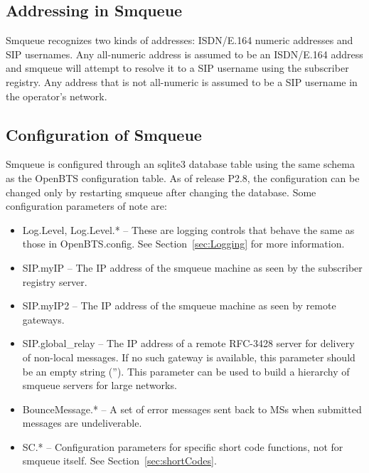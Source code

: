 \documentclass[11pt,openany]{book}
\begin{document}
\subsection{Addressing in Smqueue}
Smqueue recognizes two kinds of addresses: ISDN/E.164 numeric addresses and SIP usernames.  Any all-numeric address is assumed to be an ISDN/E.164 address and smqueue will attempt to resolve it to a SIP username using the subscriber registry.  Any address that is not all-numeric is assumed to be a SIP username in the operator's network.


\subsection{Configuration of Smqueue}
Smqueue is configured through an sqlite3 database table using the same schema as the OpenBTS configuration table.
As of release P2.8, the configuration can be changed only by restarting smqueue after changing the database.  Some configuration parameters of note are:
\begin{itemize}
	\item Log.Level, Log.Level.* -- These are logging controls that behave the same as those in OpenBTS.config.  See Section~\ref{sec:Logging} for more information.
	\item SIP.myIP -- The IP address of the smqueue machine as seen by the subscriber registry server.
	\item SIP.myIP2 -- The IP address of the smqueue machine as seen by remote gateways.
	\item SIP.global\_relay -- The IP address of a remote RFC-3428 server for delivery of non-local messages.  If no such gateway is available, this parameter should be an empty string ('').  This parameter can be used to build a hierarchy of smqueue servers for large networks.
	\item BounceMessage.* -- A set of error messages sent back to MSs when submitted messages are undeliverable.
	\item SC.* -- Configuration parameters for specific short code functions, not for smqueue itself.  See Section~\ref{sec:shortCodes}.
\end{itemize}
\end{document}
